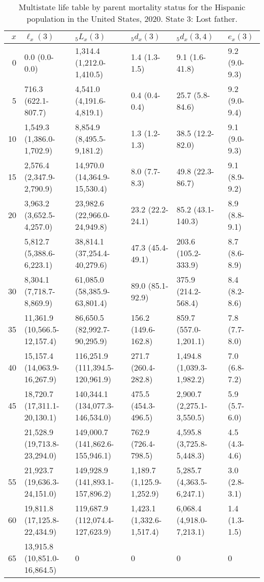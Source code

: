 \begin{table}

\caption{Multistate life table by parent mortality status for the Hispanic population in the United States, 2020. State 3: Lost father.}
\centering
\begin{tabular}[t]{rlllll}
\toprule
$x$ & $\ell_x(3)$ & ${}_5 L_x(3)$ & ${}_5 d_x(3)$ & ${}_5 d_x(3,4)$ & $e_x(3)$\\
\midrule
0 & 0.0 (0.0-0.0) & 1,314.4 (1,212.0-1,410.5) & 1.4 (1.3-1.5) & 9.1 (1.6-41.8) & 9.2 (9.0-9.3)\\
5 & 716.3 (622.1-807.7) & 4,541.0 (4,191.6-4,819.1) & 0.4 (0.4-0.4) & 25.7 (5.8-84.6) & 9.2 (9.0-9.4)\\
10 & 1,549.3 (1,386.0-1,702.9) & 8,854.9 (8,495.5-9,181.2) & 1.3 (1.2-1.3) & 38.5 (12.2-82.0) & 9.1 (9.0-9.3)\\
15 & 2,576.4 (2,347.9-2,790.9) & 14,970.0 (14,364.9-15,530.4) & 8.0 (7.7-8.3) & 49.8 (22.3-86.7) & 9.1 (8.9-9.2)\\
20 & 3,963.2 (3,652.5-4,257.0) & 23,982.6 (22,966.0-24,949.8) & 23.2 (22.2-24.1) & 85.2 (43.1-140.3) & 8.9 (8.8-9.1)\\
\addlinespace
25 & 5,812.7 (5,388.6-6,223.1) & 38,814.1 (37,254.4-40,279.6) & 47.3 (45.4-49.1) & 203.6 (105.2-333.9) & 8.7 (8.6-8.9)\\
30 & 8,304.1 (7,718.7-8,869.9) & 61,085.0 (58,385.9-63,801.4) & 89.0 (85.1-92.9) & 375.9 (214.2-568.4) & 8.4 (8.2-8.6)\\
35 & 11,361.9 (10,566.5-12,157.4) & 86,650.5 (82,992.7-90,295.9) & 156.2 (149.6-162.8) & 859.7 (557.0-1,201.1) & 7.8 (7.7-8.0)\\
40 & 15,157.4 (14,063.9-16,267.9) & 116,251.9 (111,394.5-120,961.9) & 271.7 (260.4-282.8) & 1,494.8 (1,039.3-1,982.2) & 7.0 (6.8-7.2)\\
45 & 18,720.7 (17,311.1-20,130.1) & 140,344.1 (134,077.3-146,534.0) & 475.5 (454.3-496.5) & 2,900.7 (2,275.1-3,550.5) & 5.9 (5.7-6.0)\\
\addlinespace
50 & 21,528.9 (19,713.8-23,294.0) & 149,000.7 (141,862.6-155,946.1) & 762.9 (726.4-798.5) & 4,595.8 (3,725.8-5,448.3) & 4.5 (4.3-4.6)\\
55 & 21,923.7 (19,636.3-24,151.0) & 149,928.9 (141,893.1-157,896.2) & 1,189.7 (1,125.9-1,252.9) & 5,285.7 (4,363.5-6,247.1) & 3.0 (2.8-3.1)\\
60 & 19,811.8 (17,125.8-22,434.9) & 119,687.9 (112,074.4-127,623.9) & 1,423.1 (1,332.6-1,517.4) & 6,068.4 (4,918.0-7,213.1) & 1.4 (1.3-1.5)\\
65 & 13,915.8 (10,851.0-16,864.5) & 0 & 0 & 0 & 0\\
\bottomrule
\end{tabular}
\end{table}
